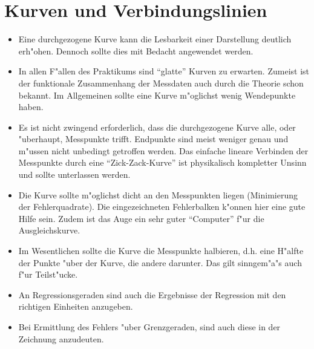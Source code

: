 \section{Kurven und Verbindungslinien}


\begin{itemize}
    \item Eine durchgezogene Kurve kann die Lesbarkeit einer
    Darstellung deutlich erh"ohen. Dennoch sollte dies mit Bedacht
    angewendet werden.
    \item In allen F"allen des Praktikums sind "`glatte"' Kurven zu
    erwarten. Zumeist ist der funktionale Zusammenhang der
    Messdaten auch durch die Theorie schon bekannt. Im Allgemeinen
    sollte eine Kurve m"oglichst wenig Wendepunkte haben.
    \item Es ist nicht zwingend erforderlich, dass die
    durchgezogene Kurve alle, oder "uberhaupt, Messpunkte trifft.
    Endpunkte sind meist weniger genau und m"ussen nicht unbedingt
    getroffen werden. Das einfache lineare Verbinden der
    Messpunkte durch eine
    "`Zick-Zack-Kurve"' ist physikalisch kompletter Unsinn und
    sollte unterlassen werden.
    \item Die Kurve sollte m"oglichst dicht an den Messpunkten
    liegen (Minimierung der Fehlerquadrate). Die eingezeichneten
    Fehlerbalken k"onnen hier eine gute Hilfe sein. Zudem ist das
    Auge ein sehr guter "`Computer"' f"ur die Ausgleichskurve.
    \item Im Wesentlichen sollte die Kurve die Messpunkte
    halbieren, d.h. eine H"alfte der Punkte "uber der Kurve, die
    andere darunter. Das gilt sinngem"a"s auch f"ur Teilst"ucke.
    \item An Regressionsgeraden sind auch die Ergebnisse der
    Regression mit den richtigen Einheiten anzugeben.
    \item Bei Ermittlung des Fehlers "uber Grenzgeraden, sind auch
    diese in der Zeichnung anzudeuten.
\end{itemize}

